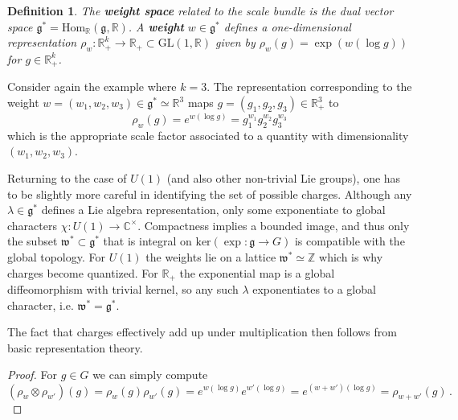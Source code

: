 \documentclass[12pt]{article}
\numberwithin{equation}{section}
\newcommand{\R}{\mathbb{R}}
\newcommand{\Z}{\mathbb{Z}}
\newcommand{\C}{\mathbb{C}}
\newtheorem{definition}[theorem]{Definition}
\newtheorem{lemma}[theorem]{Lemma}
\begin{document}
\begin{definition}
    The \textbf{weight space} related to the scale bundle is the dual vector space $\mathfrak{g}^*= \mathrm{Hom}_\R(\mathfrak{g},\R)$. A \textbf{weight} $w\in \mathfrak{g}^*$ defines a one-dimensional representation $\rho_w\colon \R_+^k \to \R_+\subset\mathrm{GL}(1,\R)$ given by $\rho_w(g) = \exp(w(\log g))$ for $g\in \R_+^k$.
\end{definition}
Consider again the example where $k=3$. The representation corresponding to the weight $w=(w_1,w_2,w_3)\in \mathfrak{g}^*\simeq \R^3$ maps $g=(g_1,g_2,g_3)\in \R_+^3$ to 
\begin{equation}
    \rho_w(g) = e^{w(\log g)} = g_1^{w_1}g_2^{w_2}g_3^{w_3}
\end{equation}
which is the appropriate scale factor associated to a quantity with dimensionality $(w_1,w_2,w_3)$.

Returning to the case of $U(1)$ (and also other non-trivial Lie groups), one has to be slightly more careful in identifying the set of possible charges. Although any $\lambda\in \mathfrak{g}^*$ defines a Lie algebra representation, only some exponentiate to global characters $\chi\colon U(1)\to \C^\times$. Compactness implies a bounded image, and thus only the subset $\mathfrak{w}^*\subset \mathfrak{g}^*$ that is integral on $\mathrm{ker}(\exp\colon \mathfrak{g}\to G)$ is compatible with the global topology. For $U(1)$ the weights lie on a lattice $\mathfrak{w}^*\simeq \Z$ which is why charges become quantized. For $\mathbb{R}_+$ the exponential map is a global diffeomorphism with trivial kernel, so any such $\lambda$ exponentiates to a global character, i.e. $\mathfrak{w}^*=\mathfrak{g}^*$.

The fact that charges effectively add up under multiplication then follows from basic representation theory.
\begin{proof}
    For $g\in G$ we can simply compute
    \begin{equation}
        (\rho_w\otimes \rho_{w'})(g) = \rho_{w}(g)\rho_{w'}(g) = e^{w(\log g)}e^{w'(\log g)} = e^{(w+w')(\log g)} = \rho_{w+w'}(g)\,.
    \end{equation}
\end{proof}
\end{document}
